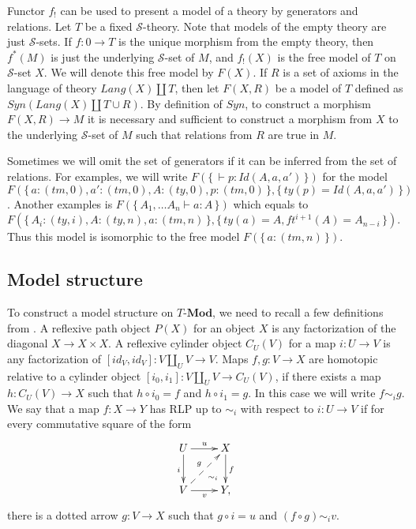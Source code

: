 \documentclass{mscs}
\newcommand{\cat}[1]{\mathbf{#1}}
\newcommand{\Mod}[1]{#1\text{-}\cat{Mod}}
\newcommand{\cyli}{i}
\numberwithin{figure}{section}
\begin{document}
Functor $f_!$ can be used to present a model of a theory by generators and relations.
Let $T$ be a fixed $\mathcal{S}$-theory.
Note that models of the empty theory are just $\mathcal{S}$-sets.
If $f : 0 \to T$ is the unique morphism from the empty theory, then $f^*(M)$ is just the underlying $\mathcal{S}$-set of $M$,
    and $f_!(X)$ is the free model of $T$ on $\mathcal{S}$-set $X$.
We will denote this free model by $F(X)$.
If $R$ is a set of axioms in the language of theory $Lang(X) \amalg T$,
    then let $F(X,R)$ be a model of $T$ defined as $Syn(Lang(X) \amalg T \cup R)$.
By definition of $Syn$, to construct a morphism $F(X,R) \to M$ it is necessary and sufficient
    to construct a morphism from $X$ to the underlying $\mathcal{S}$-set of $M$ such that relations from $R$ are true in $M$.

Sometimes we will omit the set of generators if it can be inferred from the set of relations.
For examples, we will write $F(\{\,\vdash p : Id(A,a,a')\,\})$ for the model $F(\{\,a : (tm,0), a' : (tm,0), A : (ty,0), p : (tm,0)\,\}, \{\,ty(p) = Id(A,a,a')\,\})$.
Another examples is $F(\{\,A_1, \ldots A_n \vdash a : A\,\})$ which equals to $F(\{\,A_i : (ty,i), A : (ty,n), a : (tm,n)\,\}, \{\,ty(a) = A, ft^{i+1}(A) = A_{n-i}\,\})$.
Thus this model is isomorphic to the free model $F(\{\,a : (tm,n)\,\})$.

\subsection{Model structure}

To construct a model structure on $\Mod{T}$, we need to recall a few definitions from \cite{f-model-structures}.
A reflexive path object $P(X)$ for an object $X$ is any factorization of the diagonal $X \to X \times X$.
A reflexive cylinder object $C_U(V)$ for a map $i : U \to V$ is any factorization of $[id_V,id_V] : V \amalg_U V \to V$.
Maps $f,g : V \to X$ are homotopic relative to a cylinder object $[\cyli_0,\cyli_1] : V \amalg_U V \to C_U(V)$, if there exists a map $h : C_U(V) \to X$
such that $h \circ \cyli_0 = f$ and $h \circ \cyli_1 = g$.
In this case we will write $f \sim_i g$.
We say that a map $f : X \to Y$ has RLP up to $\sim_i$ with respect to $i : U \to V$ if for every commutative square of the form
\[ \xymatrix{ U \ar[r]^u \ar@{}[dr]|(.7){\sim_i} \ar[d]_i & X \ar[d]^f \\
              V \ar[r]_v \ar@{-->}[ur]^g                  & Y,
            } \]
there is a dotted arrow $g : V \to X$ such that $g \circ i = u$ and $(f \circ g) \sim_i v$.
\end{document}
